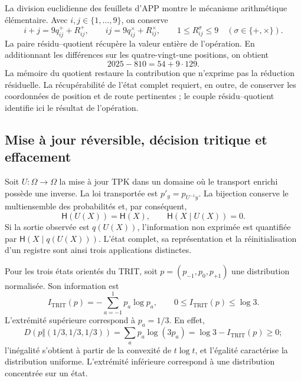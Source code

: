 La division euclidienne des feuillets d'APP montre le mécanisme
arithmétique élémentaire. Avec \(i,j\in\{1,\ldots,9\}\), on conserve
\[
 i+j=9q^+_{ij}+R^+_{ij},\qquad
 ij=9q^\times_{ij}+R^\times_{ij},\qquad
 1\leq R^\sigma_{ij}\leq9\quad(\sigma\in\{+,\times\}).
\]
La paire résidu--quotient récupère la valeur entière de l'opération. En additionnant les différences sur les quatre-vingt-une positions, on obtient
\[
 2025-810=54+9\cdot129.
\]
La mémoire du quotient restaure la contribution que n’exprime pas la
réduction résiduelle. La récupérabilité de l’état complet requiert,
en outre, de conserver les coordonnées de position et de route pertinentes ;
le couple résidu--quotient identifie ici le résultat de l’opération.

\subsection{Mise à jour réversible, décision tritique et effacement}

Soit \(U:\Omega\to\Omega\) la mise à jour TPK dans un domaine où le transport enrichi possède une inverse. La loi transportée est \(p'_y=p_{U^{-1}y}\). La bijection conserve le multiensemble des probabilités et, par conséquent,
\begin{equation}
 \mathsf H(U(X))=\mathsf H(X),\qquad
 \mathsf H(X\mid U(X))=0.
 \label{eq:ii-kb-aut-reversible}
\end{equation}
Si la sortie observée est \(q(U(X))\), l’information non exprimée
est quantifiée par \(\mathsf H(X\mid q(U(X)))\). L’état complet,
sa représentation et la réinitialisation d’un registre sont ainsi trois applications distinctes.

Pour les trois états orientés du TRIT, soit
\(p=(p_{-1},p_0,p_{+1})\) une distribution normalisée. Son information est
\begin{equation}
 I_{\mathrm{TRIT}}(p)=-\sum_{a=-1}^{1}p_a\log p_a,
 \qquad 0\leq I_{\mathrm{TRIT}}(p)\leq\log3.
 \label{eq:ii-kb-aut-trit}
\end{equation}
L'extrémité supérieure correspond à \(p_a=1/3\). En effet,
\[
 D(p\Vert(1/3,1/3,1/3))
 =\sum_ap_a\log(3p_a)=\log3-I_{\mathrm{TRIT}}(p)\geq0;
\]
l'inégalité s'obtient à partir de la convexité de \(t\log t\), et l'égalité caractérise la distribution uniforme. L'extrémité inférieure correspond à une distribution concentrée sur un état.

